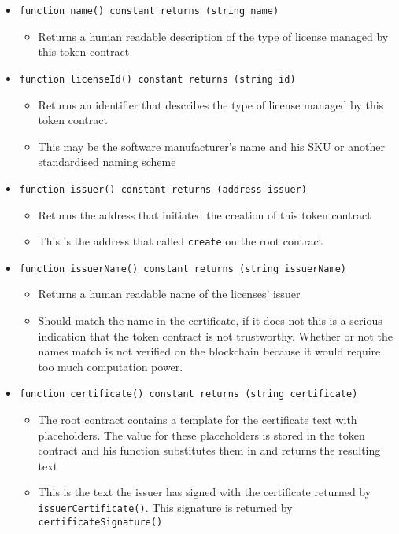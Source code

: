 \documentclass[a4paper]{article}
\begin{document}
\begin{itemize}
  
  \item \texttt{function name() constant returns (string name)}
  \begin{itemize}
    \item Returns a human readable description of the type of license managed by this token contract
  \end{itemize}
  
  \item \texttt{function licenseId() constant returns (string id)}
  \begin{itemize}
    \item Returns an identifier that describes the type of license managed by this token contract
    \item This may be the software manufacturer's name and his SKU or another standardised naming scheme
  \end{itemize}

  
  \item \texttt{function issuer() constant returns (address issuer)}
  \begin{itemize}
    \item Returns the address that initiated the creation of this token contract
    \item This is the address that called \texttt{create} on the root contract
  \end{itemize}
    
  \item \texttt{function issuerName() constant returns (string issuerName)}
  \begin{itemize}
    \item Returns a human readable name of the licenses' issuer
    \item Should match the name in the certificate, if it does not this is a serious indication that the token contract is not trustworthy. Whether or not the names match is not verified on the blockchain because it would require too much computation power.
  \end{itemize}

  \item \texttt{function certificate() constant returns (string certificate)}
  \begin{itemize}
    \item The root contract contains a template for the certificate text with placeholders. The value for these placeholders is stored in the token contract and his function substitutes them in and returns the resulting text
    \item This is the text the issuer has signed with the certificate returned by \texttt{issuerCertificate()}. This signature is returned by \texttt{certificateSignature()}
  \end{itemize}
  

\end{itemize}
\end{document}
